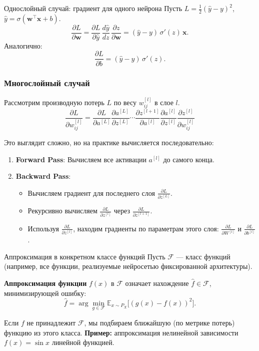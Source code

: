 \documentclass[notheorems, handout]{beamer}
\begin{document}
\begin{frame}{Однослойный случай: градиент для одного нейрона}
  Пусть $L=\tfrac12(\hat y - y)^2$, $\hat y = \sigma(\bm{w}^\top \bm{x}+b)$.
  \[
    \frac{\partial L}{\partial \bm{w}} = \frac{\partial L}{\partial \hat y}\,\frac{d\hat y}{dz}\,\frac{\partial z}{\partial \bm{w}}
    = (\hat y - y)\,\sigma'(z)\,\bm{x}.
  \]
  Аналогично:
  \[
    \frac{\partial L}{\partial b} = (\hat y - y)\,\sigma'(z).
  \]
\end{frame}
\begin{frame}
    \frametitle{Многослойный случай}
    Рассмотрим производную потерь $L$ по весу $w_{ij}^{[l]}$ в слое $l$.
    \[ \frac{\partial L}{\partial w_{ij}^{[l]}} = \frac{\partial L}{\partial a^{[L]}} \frac{\partial a^{[L]}}{\partial z^{[L]}} \cdots \frac{\partial z^{[l+1]}}{\partial a^{[l]}} \frac{\partial a^{[l]}}{\partial z^{[l]}} \frac{\partial z^{[l]}}{\partial w_{ij}^{[l]}} \]
    
    Это выглядит сложно, но на практике вычисляется последовательно:
    \begin{enumerate}
        \item \textbf{Forward Pass}: Вычисляем все активации $a^{[l]}$ до самого конца.
        \item \textbf{Backward Pass}:
            \begin{itemize}
                \item Вычисляем градиент для последнего слоя $\frac{\partial L}{\partial z^{[L]}}$.
                \item Рекурсивно вычисляем $\frac{\partial L}{\partial z^{[l]}}$ через $\frac{\partial L}{\partial z^{[l+1]}}$.
                \item Используя $\frac{\partial L}{\partial z^{[l]}}$, находим градиенты по параметрам этого слоя: $\frac{\partial L}{\partial W^{[l]}}$ и $\frac{\partial L}{\partial b^{[l]}}$.
            \end{itemize}
    \end{enumerate}
\end{frame}
\begin{frame}{Аппроксимация в конкретном классе функций}
  Пусть $\mathcal{F}$ — класс функций (например, все функции, реализуемые нейросетью фиксированной архитектуры).

  \vspace{0.5em}
  \textbf{Аппроксимация функции} $f(x)$ в $\mathcal{F}$ означает нахождение $\hat{f}\in\mathcal{F}$, минимизирующей ошибку:
  \[
    \hat{f} = \arg\min_{g\in\mathcal{F}} \mathbb{E}_{x\sim P_X} \bigl[ (g(x) - f(x))^2 \bigr].
  \]

  \vspace{0.5em}
  Если $f$ не принадлежит $\mathcal{F}$, мы подбираем ближайшую (по метрике потерь) функцию из этого класса.  
  \textbf{Пример:} аппроксимация нелинейной зависимости $f(x)=\sin x$ линейной функцией.
\end{frame}
\end{document}

